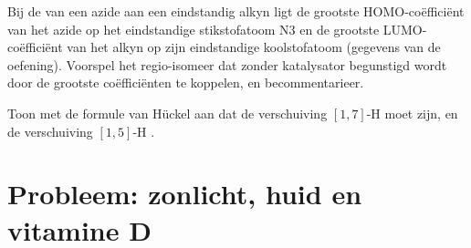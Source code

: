 \begin{exercise}[$\star\star\star$]\label{exo:b3:pericyclic:11}
Bij de  van een azide aan een eindstandig
alkyn ligt de grootste HOMO-coëfficiënt van het azide op het eindstandige
stikstofatoom N3 en de grootste LUMO-coëfficiënt van het alkyn op zijn
eindstandige koolstofatoom (gegevens van de oefening). Voorspel het
regio-isomeer dat zonder katalysator begunstigd wordt door de grootste
coëfficiënten te koppelen, en becommentarieer.
\end{exercise}

\begin{exercise}[$\star\star\star$]\label{exo:b3:pericyclic:12}
Toon met de formule van Hückel aan dat de verschuiving $[1,7]$-H  moet zijn,
en de verschuiving $[1,5]$-H .
\end{exercise}

\clearpage
\enlargethispage{3\baselineskip}
\section{Probleem: zonlicht, huid en vitamine D}

